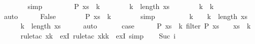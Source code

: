 \begin{isabellebody}
\ \ \ \ \ \ \isamarkupfalse%
\ simp\isanewline
\ \ \ \ \isamarkupfalse%
\ \isamarkupfalse%
\ {\isachardoublequoteopen}{\isasymnot}\ P\ {\isacharparenleft}xs\ {\isacharbang}\ k{\isacharprime}{\isacharparenright}{\isachardoublequoteclose}\isanewline
\ \ \ \ \ \ \isamarkupfalse%
\ {\isacharbackquoteopen}k{}{\isacharprime}\ {\isacharless}\ length\ {\isacharquery}xs{\isacharbackquoteclose}\isanewline
\ \ \ \ \ \ \isamarkupfalse%
\ {\isacartoucheopen}k{}\ {\isacharless}\ k{\isacharprime}{\isacartoucheclose}\isanewline
\ \ \ \ \ \ \isamarkupfalse%
\ auto\isanewline
\ \ \ \ \isamarkupfalse%
\ False\isanewline
\ \ \ \ \ \ \isamarkupfalse%
\ {\isacharbackquoteopen}P\ {\isacharparenleft}xs\ {\isacharbang}\ k{\isacharprime}{\isacharparenright}{\isacharbackquoteclose}\isanewline
\ \ \ \ \ \ \isamarkupfalse%
\ simp\isanewline
\ \ \isamarkupfalse%
\isanewline
\ \ \isamarkupfalse%
\isanewline
\ \ \isamarkupfalse%
\ {\isachardoublequoteopen}k{}\ {\isacharplus}\ {}\ {\isacharplus}\ k{}{\isacharprime}\ {\isacharless}\ length\ xs{\isachardoublequoteclose}\isanewline
\ \ \ \ \isamarkupfalse%
\ {\isacharbackquoteopen}k{}{\isacharprime}\ {\isacharless}\ length\ {\isacharquery}xs{\isacharbackquoteclose}\isanewline
\ \ \ \ \isamarkupfalse%
\ auto\isanewline
\ \ \isamarkupfalse%
\isanewline
\ \ \isamarkupfalse%
\ {\isacharquery}case\isanewline
\ \ \ \ \isamarkupfalse%
\ {\isacharbackquoteopen}P\ {\isacharparenleft}xs\ {\isacharbang}\ k{}{\isacharparenright}{\isacharbackquoteclose}\ {\isacharbackquoteopen}filter\ P\ xs\ {\isacharbang}\ {}\ {\isacharequal}\ xs\ {\isacharbang}\ k{}{\isacharbackquoteclose}\isanewline
\ \ \ \ \isamarkupfalse%
\ {\isacharparenleft}rule{\isacharunderscore}tac\ x{\isacharequal}k{}\ \ exI{\isacharcomma}\ rule{\isacharunderscore}tac\ x{\isacharequal}{\isachardoublequoteopen}k{}{\isacharplus}{}{\isacharplus}k{}{\isacharprime}{\isachardoublequoteclose}\ \ exI{\isacharcomma}\ simp{\isacharparenright}\isanewline
{}\isamarkupfalse%
\isanewline
\ \ \isamarkupfalse%
\ {\isacharparenleft}Suc\ i{\isacharparenright}\isanewline
\ \ \isamarkupfalse%

\end{isabellebody}
